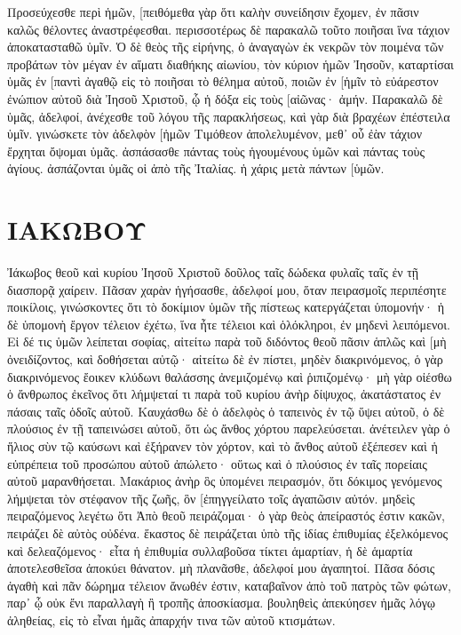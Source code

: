 Προσεύχεσθε περὶ ἡμῶν, [πειθόμεθα γὰρ ὅτι καλὴν συνείδησιν ἔχομεν, ἐν πᾶσιν καλῶς θέλοντες ἀναστρέφεσθαι. 
περισσοτέρως δὲ παρακαλῶ τοῦτο ποιῆσαι ἵνα τάχιον ἀποκατασταθῶ ὑμῖν. 
Ὁ δὲ θεὸς τῆς εἰρήνης, ὁ ἀναγαγὼν ἐκ νεκρῶν τὸν ποιμένα τῶν προβάτων τὸν μέγαν ἐν αἵματι διαθήκης αἰωνίου, τὸν κύριον ἡμῶν Ἰησοῦν, 
καταρτίσαι ὑμᾶς ἐν [παντὶ ἀγαθῷ εἰς τὸ ποιῆσαι τὸ θέλημα αὐτοῦ, ποιῶν ἐν [ἡμῖν τὸ εὐάρεστον ἐνώπιον αὐτοῦ διὰ Ἰησοῦ Χριστοῦ, ᾧ ἡ δόξα εἰς τοὺς [αἰῶνας· ἀμήν. 
Παρακαλῶ δὲ ὑμᾶς, ἀδελφοί, ἀνέχεσθε τοῦ λόγου τῆς παρακλήσεως, καὶ γὰρ διὰ βραχέων ἐπέστειλα ὑμῖν. 
γινώσκετε τὸν ἀδελφὸν [ἡμῶν Τιμόθεον ἀπολελυμένον, μεθ᾽ οὗ ἐὰν τάχιον ἔρχηται ὄψομαι ὑμᾶς. 
ἀσπάσασθε πάντας τοὺς ἡγουμένους ὑμῶν καὶ πάντας τοὺς ἁγίους. ἀσπάζονται ὑμᾶς οἱ ἀπὸ τῆς Ἰταλίας. 
ἡ χάρις μετὰ πάντων [ὑμῶν. 
\section{ΙΑΚΩΒΟΥ}
Ἰάκωβος θεοῦ καὶ κυρίου Ἰησοῦ Χριστοῦ δοῦλος ταῖς δώδεκα φυλαῖς ταῖς ἐν τῇ διασπορᾷ χαίρειν. 
Πᾶσαν χαρὰν ἡγήσασθε, ἀδελφοί μου, ὅταν πειρασμοῖς περιπέσητε ποικίλοις, 
γινώσκοντες ὅτι τὸ δοκίμιον ὑμῶν τῆς πίστεως κατεργάζεται ὑπομονήν· 
ἡ δὲ ὑπομονὴ ἔργον τέλειον ἐχέτω, ἵνα ἦτε τέλειοι καὶ ὁλόκληροι, ἐν μηδενὶ λειπόμενοι. 
Εἰ δέ τις ὑμῶν λείπεται σοφίας, αἰτείτω παρὰ τοῦ διδόντος θεοῦ πᾶσιν ἁπλῶς καὶ [μὴ ὀνειδίζοντος, καὶ δοθήσεται αὐτῷ· 
αἰτείτω δὲ ἐν πίστει, μηδὲν διακρινόμενος, ὁ γὰρ διακρινόμενος ἔοικεν κλύδωνι θαλάσσης ἀνεμιζομένῳ καὶ ῥιπιζομένῳ· 
μὴ γὰρ οἰέσθω ὁ ἄνθρωπος ἐκεῖνος ὅτι λήμψεταί τι παρὰ τοῦ κυρίου 
ἀνὴρ δίψυχος, ἀκατάστατος ἐν πάσαις ταῖς ὁδοῖς αὐτοῦ. 
Καυχάσθω δὲ ὁ ἀδελφὸς ὁ ταπεινὸς ἐν τῷ ὕψει αὐτοῦ, 
ὁ δὲ πλούσιος ἐν τῇ ταπεινώσει αὐτοῦ, ὅτι ὡς ἄνθος χόρτου παρελεύσεται. 
ἀνέτειλεν γὰρ ὁ ἥλιος σὺν τῷ καύσωνι καὶ ἐξήρανεν τὸν χόρτον, καὶ τὸ ἄνθος αὐτοῦ ἐξέπεσεν καὶ ἡ εὐπρέπεια τοῦ προσώπου αὐτοῦ ἀπώλετο· οὕτως καὶ ὁ πλούσιος ἐν ταῖς πορείαις αὐτοῦ μαρανθήσεται. 
Μακάριος ἀνὴρ ὃς ὑπομένει πειρασμόν, ὅτι δόκιμος γενόμενος λήμψεται τὸν στέφανον τῆς ζωῆς, ὃν [ἐπηγγείλατο τοῖς ἀγαπῶσιν αὐτόν. 
μηδεὶς πειραζόμενος λεγέτω ὅτι Ἀπὸ θεοῦ πειράζομαι· ὁ γὰρ θεὸς ἀπείραστός ἐστιν κακῶν, πειράζει δὲ αὐτὸς οὐδένα. 
ἕκαστος δὲ πειράζεται ὑπὸ τῆς ἰδίας ἐπιθυμίας ἐξελκόμενος καὶ δελεαζόμενος· 
εἶτα ἡ ἐπιθυμία συλλαβοῦσα τίκτει ἁμαρτίαν, ἡ δὲ ἁμαρτία ἀποτελεσθεῖσα ἀποκύει θάνατον. 
μὴ πλανᾶσθε, ἀδελφοί μου ἀγαπητοί. 
Πᾶσα δόσις ἀγαθὴ καὶ πᾶν δώρημα τέλειον ἄνωθέν ἐστιν, καταβαῖνον ἀπὸ τοῦ πατρὸς τῶν φώτων, παρ᾽ ᾧ οὐκ ἔνι παραλλαγὴ ἢ τροπῆς ἀποσκίασμα. 
βουληθεὶς ἀπεκύησεν ἡμᾶς λόγῳ ἀληθείας, εἰς τὸ εἶναι ἡμᾶς ἀπαρχήν τινα τῶν αὐτοῦ κτισμάτων. 
